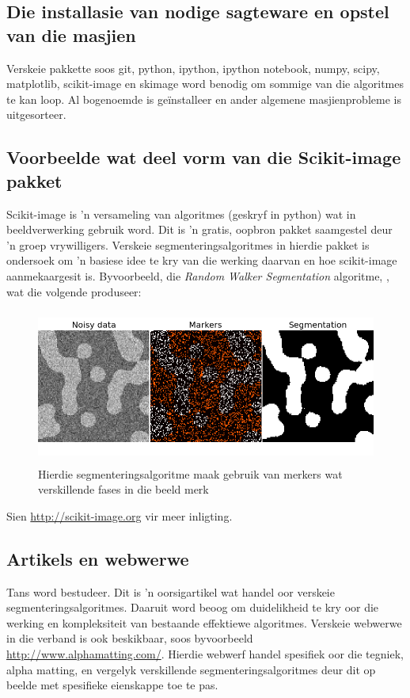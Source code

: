 \documentclass[a4paper,10pt]{article}
\begin{document}
\subsection{Die installasie van nodige sagteware en opstel van die masjien}
Verskeie pakkette soos git, python, ipython, ipython notebook, numpy, scipy, matplotlib, scikit-image en skimage word benodig om sommige van die 
algoritmes te kan loop.  Al bogenoemde is ge\"{i}nstalleer en ander algemene masjienprobleme is uitgesorteer. 

\subsection{Voorbeelde wat deel vorm van die Scikit-image pakket}
Scikit-image is 'n versameling van algoritmes (geskryf in python) wat in beeldverwerking gebruik word.  Dit is 'n gratis, oopbron pakket saamgestel
deur 'n groep vrywilligers. Verskeie segmenteringsalgoritmes in hierdie pakket is ondersoek om 'n 
basiese idee te kry van die werking daarvan en hoe scikit-image aanmekaargesit is. 
Byvoorbeeld, die \emph{Random Walker Segmentation} algoritme, \cite{scikit}, wat die volgende produseer:
\begin{figure}[H]
 \centering
 \includegraphics[width=5in, height=2in]{Verslag1_fig}
 \caption{Hierdie segmenteringsalgoritme maak gebruik van merkers wat verskillende fases in die beeld merk}
 \label{haai}
\end{figure}
\noindent Sien \url{http://scikit-image.org} vir meer inligting.

\subsection{Artikels en webwerwe}
Tans word \cite{art} bestudeer.  Dit is 'n oorsigartikel wat handel oor verskeie segmenteringsalgoritmes.  Daaruit word beoog om duidelikheid te kry oor die werking en kompleksiteit van bestaande effektiewe algoritmes.  Verskeie webwerwe in die 
verband is ook beskikbaar, soos byvoorbeeld \url{http://www.alphamatting.com/}.  Hierdie webwerf handel spesifiek oor die tegniek,
alpha matting, en vergelyk verskillende segmenteringsalgoritmes deur dit op beelde met spesifieke eienskappe toe te pas.  
\end{document}
